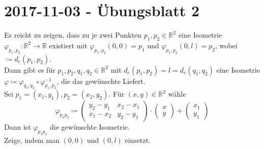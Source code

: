 % 
\newpage
\section{2017-11-03 - Übungsblatt 2}
% 
\begin{problem*}[1a]
Es reicht zu zeigen, dass zu je zwei Punkten $ p_1, p_2 \in \mathbb{R}^2$ eine Isometrie $\varphi_{ p_1,p_2 }: \mathbb{R}^2 \to \mathbb{R}$ existiert mit $ \varphi_{ p_1,p_2 }(0,0) = p_1 $ und
$\varphi_{ p_1,p_2 }(0,l) = p_2$, wobei $ \coloneqq d_e(p_1,p_2) $.\\
Dann gibt es für $ p_1,p_2,q_1,q_2 \in \mathbb{R}^2 $ mit $ d_e(p_1,p_2) = l = d_e(q_1,q_2)$ eine Isometrie $ \varphi \coloneqq \varphi_{ q_1,q_2 } \circ \varphi_{ p_1,p_2 }^{ -1 } $, die das gewünschte Liefert.\\  
Sei $p_1 = (x_1,y_1), p_2 = (x_2, y_2) $. Für $ (x,y) \in \mathbb{R}^2 $ wähle
\begin{equation*}
\varphi_{ p_1p_2} \coloneqq \begin{pmatrix}
	y_2-y_1 & x_2 - x_1 \\
	x_1 - x_2 & y_2 -y_1
\end{pmatrix}\cdot
\begin{pmatrix}
x\\
y	
\end{pmatrix} + 
\begin{pmatrix}
x_1\\
y_1
\end{pmatrix}
\end{equation*}
Dann ist $ \varphi_{ p_1p_2 } $ die gewünschte Isometrie.\\
Zeige, indem man $(0,0)$ und $ (0,l) $ einsetzt.
\end{problem*}
